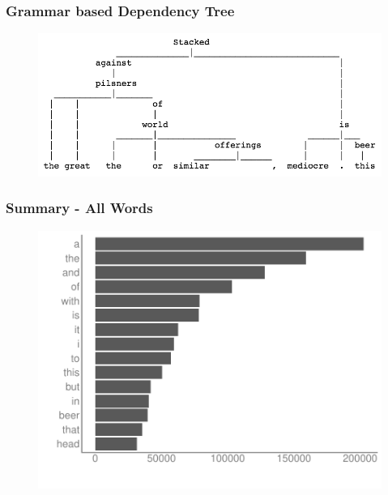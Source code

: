 \begin{frame}
    \label{dependency_tree}
    \frametitle{Grammar based Dependency Tree}
    \begin{figure}[htb]
        \begin{center}
            \includegraphics[scale=0.35]{img/figures/dependency_tree}
        \end{center}
    \end{figure}
\begin{flushright}
\hyperlink{review_verbs}{}
\end{flushright}
\end{frame}

\begin{frame}
    \frametitle{Summary - All Words}
    \label{text_all}
\begin{figure}[htb]
\includegraphics[scale=0.55,left]{img/figures/bar_words}
\end{figure}
\vspace{-40pt}
\begin{flushright}
\hyperlink{beer_review}{}
\end{flushright}
\end{frame}


